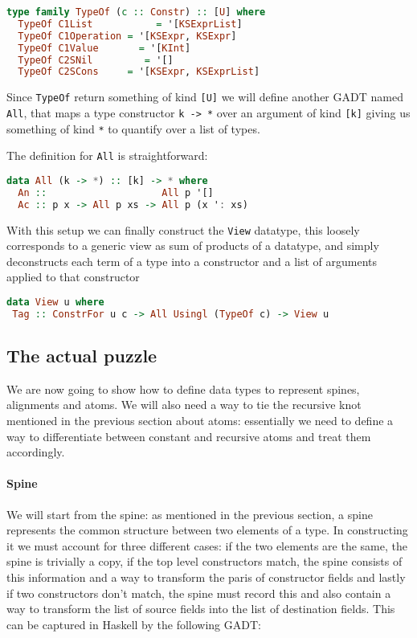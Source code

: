 \documentclass[11pt]{article}
\begin{document}
\begin{lstlisting}[language=haskell]
type family TypeOf (c :: Constr) :: [U] where
  TypeOf C1List           = '[KSExprList]
  TypeOf C1Operation = '[KSExpr, KSExpr]
  TypeOf C1Value       = '[KInt]
  TypeOf C2SNil         = '[]
  TypeOf C2SCons     = '[KSExpr, KSExprList]
\end{lstlisting}

Since \texttt{TypeOf} return something of kind \texttt{{[}U{]}} we will
define another GADT named \texttt{All}, that maps a type constructor
\texttt{k\ -\textgreater{}\ *} over an argument of kind \texttt{{[}k{]}}
giving us something of kind \texttt{*} to quantify over a list of types.

The definition for \texttt{All} is straightforward:

\begin{lstlisting}[language=haskell]
data All (k -> *) :: [k] -> * where
  An ::                    All p '[]
  Ac :: p x -> All p xs -> All p (x ': xs)
\end{lstlisting}

With this setup we can finally construct the \texttt{View} datatype,
this loosely corresponds to a generic view as sum of products of a
datatype, and simply deconstructs each term of a type into a constructor
and a list of arguments applied to that constructor

\begin{lstlisting}[language=haskell]
data View u where
 Tag :: ConstrFor u c -> All Usingl (TypeOf c) -> View u
\end{lstlisting}

\subsection{The actual puzzle}\label{the-actual-puzzle}

We are now going to show how to define data types to represent spines, 
alignments and atoms. We will also need a way to tie the recursive knot 
mentioned in the previous section about atoms: essentially we need to define a way to 
differentiate between constant and recursive atoms and treat them accordingly.

\paragraph{Spine}\label{spine-1}

We will start from the spine: as mentioned in the previous section, a
spine represents the common structure between two elements of a type. In
constructing it we must account for three different cases: if the two
elements are the same, the spine is trivially a copy, if the top level
constructors match, the spine consists of this information and a way to
transform the paris of constructor fields and lastly if two constructors
don't match, the spine must record this and also contain a way to
transform the list of source fields into the list of destination fields.
This can be captured in Haskell by the following GADT:
\end{document}

